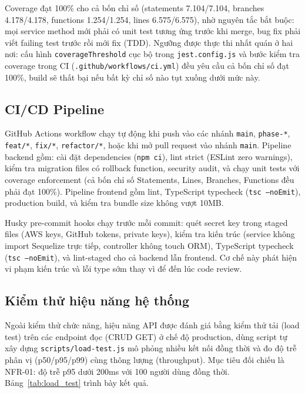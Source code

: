 Coverage đạt 100\% cho cả bốn chỉ số (statements 7.104/7.104, branches 4.178/4.178, functions 1.254/1.254, lines 6.575/6.575), nhờ nguyên tắc bắt buộc: mọi service method mới phải có unit test tương ứng trước khi merge, bug fix phải viết failing test trước rồi mới fix (TDD). Ngưỡng được thực thi nhất quán ở hai nơi: cấu hình \texttt{coverageThreshold} cục bộ trong \texttt{jest.config.js} và bước kiểm tra coverage trong CI (\texttt{.github/workflows/ci.yml}) đều yêu cầu cả bốn chỉ số đạt 100\%, build sẽ thất bại nếu bất kỳ chỉ số nào tụt xuống dưới mức này.

\subsection{CI/CD Pipeline}

GitHub Actions workflow chạy tự động khi push vào các nhánh \texttt{main}, \texttt{phase-*}, \texttt{feat/*}, \texttt{fix/*}, \texttt{refactor/*}, hoặc khi mở pull request vào nhánh \texttt{main}. Pipeline backend gồm: cài đặt dependencies (\texttt{npm ci}), lint strict (ESLint zero warnings), kiểm tra migration files có rollback function, security audit, và chạy unit tests với coverage enforcement (cả bốn chỉ số Statements, Lines, Branches, Functions đều phải đạt 100\%). Pipeline frontend gồm lint, TypeScript typecheck (\texttt{tsc --noEmit}), production build, và kiểm tra bundle size không vượt 10MB.

Husky pre-commit hooks chạy trước mỗi commit: quét secret key trong staged files (AWS keys, GitHub tokens, private keys), kiểm tra kiến trúc (service không import Sequelize trực tiếp, controller không touch ORM), TypeScript typecheck (\texttt{tsc --noEmit}), và lint-staged cho cả backend lẫn frontend. Cơ chế này phát hiện vi phạm kiến trúc và lỗi type sớm thay vì để đến lúc code review.

\subsection{Kiểm thử hiệu năng hệ thống}
\label{sec:c4_load_test}

Ngoài kiểm thử chức năng, hiệu năng API được đánh giá bằng kiểm thử tải (load test) trên các endpoint đọc (CRUD GET) ở chế độ production, dùng script tự xây dựng \texttt{scripts/load-test.js} mô phỏng nhiều kết nối đồng thời và đo độ trễ phân vị (p50\slash p95\slash p99) cùng thông lượng (throughput). Mục tiêu đối chiếu là NFR-01: độ trễ p95 dưới 200ms với 100 người dùng đồng thời. Bảng~\ref{tab:load_test} trình bày kết quả.

